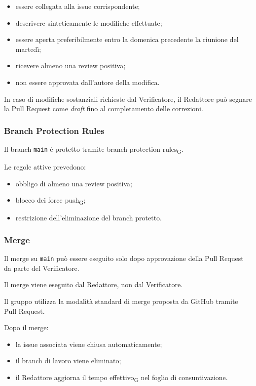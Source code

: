 \begin{itemize}
    \item essere collegata alla issue corrispondente;
    \item descrivere sinteticamente le modifiche effettuate;
    \item essere aperta preferibilmente entro la domenica precedente la riunione del
    martedì;
    \item ricevere almeno una review positiva;
    \item non essere approvata dall'autore della modifica.
\end{itemize}

In caso di modifiche sostanziali richieste dal Verificatore, il Redattore può
segnare la Pull Request come \textit{draft} fino al completamento delle correzioni.


\subsubsection{Branch Protection Rules}

Il branch \texttt{main} è protetto tramite branch protection rules\textsubscript{G}.

Le regole attive prevedono:

\begin{itemize}
    \item obbligo di almeno una review positiva;
    \item blocco dei force push\textsubscript{G};
    \item restrizione dell'eliminazione del branch protetto.
\end{itemize}


\subsubsection{Merge}

Il merge su \texttt{main} può essere eseguito solo dopo approvazione della Pull
Request da parte del Verificatore.

Il merge viene eseguito dal Redattore, non dal Verificatore.

Il gruppo utilizza la modalità standard di merge proposta da GitHub tramite Pull
Request.

Dopo il merge:

\begin{itemize}
    \item la issue associata viene chiusa automaticamente;
    \item il branch di lavoro viene eliminato;
    \item il Redattore aggiorna il tempo effettivo\textsubscript{G} nel foglio di consuntivazione.
\end{itemize}

